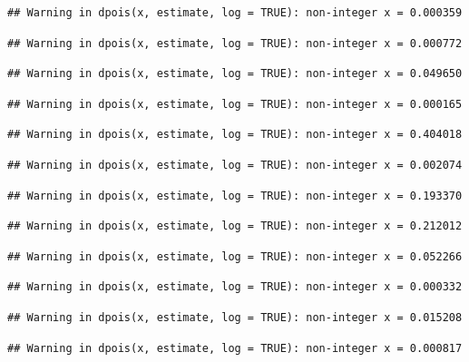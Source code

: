 \documentclass[]{article}
\begin{document}
\begin{verbatim}
## Warning in dpois(x, estimate, log = TRUE): non-integer x = 0.000359
\end{verbatim}

\begin{verbatim}
## Warning in dpois(x, estimate, log = TRUE): non-integer x = 0.000772
\end{verbatim}

\begin{verbatim}
## Warning in dpois(x, estimate, log = TRUE): non-integer x = 0.049650
\end{verbatim}

\begin{verbatim}
## Warning in dpois(x, estimate, log = TRUE): non-integer x = 0.000165
\end{verbatim}

\begin{verbatim}
## Warning in dpois(x, estimate, log = TRUE): non-integer x = 0.404018
\end{verbatim}

\begin{verbatim}
## Warning in dpois(x, estimate, log = TRUE): non-integer x = 0.002074
\end{verbatim}

\begin{verbatim}
## Warning in dpois(x, estimate, log = TRUE): non-integer x = 0.193370
\end{verbatim}

\begin{verbatim}
## Warning in dpois(x, estimate, log = TRUE): non-integer x = 0.212012
\end{verbatim}

\begin{verbatim}
## Warning in dpois(x, estimate, log = TRUE): non-integer x = 0.052266
\end{verbatim}

\begin{verbatim}
## Warning in dpois(x, estimate, log = TRUE): non-integer x = 0.000332
\end{verbatim}

\begin{verbatim}
## Warning in dpois(x, estimate, log = TRUE): non-integer x = 0.015208
\end{verbatim}

\begin{verbatim}
## Warning in dpois(x, estimate, log = TRUE): non-integer x = 0.000817
\end{verbatim}
\end{document}
